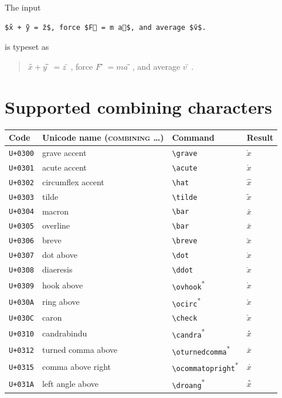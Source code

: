 \documentclass{article}
\begin{document}
\LuaAccentsOff
The input
\begin{verbatim}
$x̂ + ỹ = z̄$, force $F⃗ = m a⃗$, and average $v̄$.
\end{verbatim}
\LuaAccentsOn
is typeset as
\begin{quote}
$x̂ + ỹ = z̄$, force $F⃗ = m a⃗$, and average $v̄$.
\end{quote}

\section{Supported combining characters}

\begin{longtable}{llll}
\toprule
Code & Unicode name (\textsc{combining} \ldots) & Command & Result\\
\midrule
\endhead
\texttt{U+0300} & grave accent & \verb|\grave| & $\grave{x}$\\
\texttt{U+0301} & acute accent & \verb|\acute| & $\acute{x}$\\
\texttt{U+0302} & circumflex accent & \verb|\hat| & $\hat{x}$\\
\texttt{U+0303} & tilde & \verb|\tilde| & $\tilde{x}$\\
\texttt{U+0304} & macron & \verb|\bar| & $\bar{x}$\\
\texttt{U+0305} & overline & \verb|\bar| & $\bar{x}$\\
\texttt{U+0306} & breve & \verb|\breve| & $\breve{x}$\\
\texttt{U+0307} & dot above & \verb|\dot| & $\dot{x}$\\
\texttt{U+0308} & diaeresis & \verb|\ddot| & $\ddot{x}$\\
\texttt{U+0309} & hook above & \verb|\ovhook|\textsuperscript{*} & $\ovhook{x}$\\
\texttt{U+030A} & ring above & \verb|\ocirc|\textsuperscript{*} & $\ocirc{x}$\\
\texttt{U+030C} & caron & \verb|\check| & $\check{x}$\\
\texttt{U+0310} & candrabindu & \verb|\candra|\textsuperscript{*} & $\candra{x}$\\
\texttt{U+0312} & turned comma above & \verb|\oturnedcomma|\textsuperscript{*} & $\oturnedcomma{x}$\\
\texttt{U+0315} & comma above right & \verb|\ocommatopright|\textsuperscript{*} & $\ocommatopright{x}$\\
\texttt{U+031A} & left angle above & \verb|\droang|\textsuperscript{*} & $\droang{x}$\\

\end{longtable}
\end{document}
